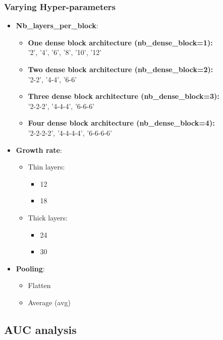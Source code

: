 \subsubsection{Varying Hyper-parameters}
\begin{itemize}
 \item \textbf{Nb\_layers\_per\_block}:
 \begin{itemize}
  \item \textbf{One dense block architecture (nb\_dense\_block=1):}\\
  '2', '4', '6', '8', '10', '12'
  \item \textbf{Two dense block architecture (nb\_dense\_block=2):}\\
  '2-2', '4-4', '6-6'
  \item \textbf{Three dense block architecture (nb\_dense\_block=3):}\\
  '2-2-2', '4-4-4', '6-6-6'
  \item \textbf{Four dense block architecture (nb\_dense\_block=4):}\\
  '2-2-2-2', '4-4-4-4', '6-6-6-6'
 \end{itemize}
 \item \textbf{Growth rate}:
  \begin{itemize}
  \item Thin layers:
    \begin{itemize} 
    \item 12
    \item 18
  \end{itemize}
  \item Thick layers:
    \begin{itemize} 
    \item 24
    \item 30
  \end{itemize}
 \end{itemize}
 \item \textbf{Pooling}:
 \begin{itemize}
  \item Flatten
  \item Average (avg)
 \end{itemize}  
 
\end{itemize}
\flushbottom
\newpage

\subsection{AUC analysis}
  

